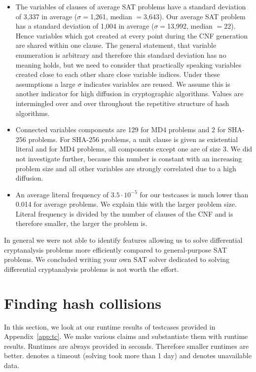 \begin{itemize}
  \item The variables of clauses of average SAT problems
    have a standard deviation of 3,337 in average ($\sigma=$1,261, median $=$3,643).
    Our average SAT problem has a standard deviation of 1,004 in average
    ($\sigma=$13,992, median $=22$). Hence variables which got created at every
    point during the CNF generation are shared within one clause.
    The general statement, that variable enumeration is arbitrary
    and therefore this standard deviation has no meaning holds, but we need
    to consider that practically speaking variables created close to each
    other share close variable indices.
    Under these assumptions a large $\sigma$ indicates variables are reused.
    We assume this is another indicator for high diffusion in cryptographic
    algorithms. Values are intermingled over and over throughout the repetitive
    structure of hash algorithms.

  \item Connected variables components are 129 for MD4 problems and 2 for SHA-256
    problems. For SHA-256 problems, a unit clause is given as existential literal
    and for MD4 problems, all components except one are of size 3.
    We did not investigate further, because this number is constant
    with an increasing problem size and all other variables are strongly
    correlated due to a high diffusion.

  \item An average literal frequency of $3.5\cdot 10^{-5}$ for our testcases
    is much lower than 0.014 for average problems. We explain this with the
    larger problem size. Literal frequency is divided by the number of clauses
    of the CNF and is therefore smaller, the larger the problem is.
\end{itemize}

In general we were not able to identify features allowing us to solve
differential cryptanalysis problems more efficiently compared to
general-purpose SAT problems. We concluded writing your own SAT solver
dedicated to solving differential cryptanalysis problems is not worth
the effort.

\section{Finding hash collisions}
\label{sec:results-attacks}
%
In this section, we look at our runtime results of testcases provided in
Appendix~\ref{app:tc}. We make various claims and substantiate them
with runtime results. Runtimes are always provided in seconds. Therefore
smaller runtimes are better. \timeout{} denotes a timeout (solving took
more than 1 day) and \unknown{} denotes unavailable data.

